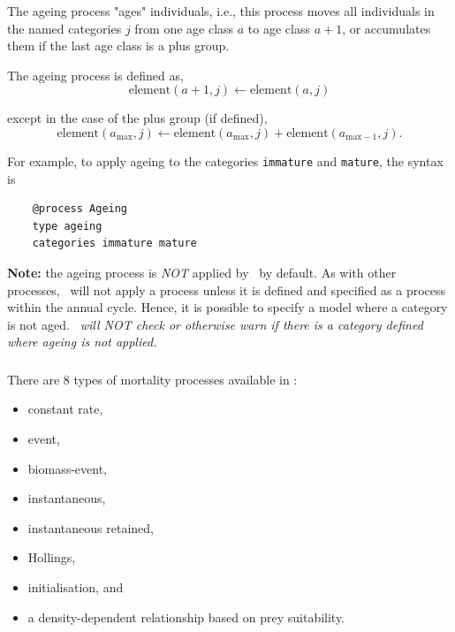 \subsubsection{\label{sec:ageing}}

The ageing process "ages" individuals, i.e., this process moves all individuals in the named categories $j$ from one age class $a$ to age class $a + 1$, or accumulates them if the last age class is a plus group.

The ageing process is defined as,
\begin{equation}
  \text{element}(a + 1,j) \leftarrow \text{element}(a,j)
\end{equation}

except in the case of the plus group (if defined),
\begin{equation}
  \text{element}(a_{\text{max}}, j) \leftarrow \text{element}(a_{\text{max}}, j) + \text{element}(a_{\text{max}-1}, j).
\end{equation}

For example, to apply ageing to the categories \texttt{immature} and \texttt{mature}, the syntax is

{\small{\begin{verbatim}
	@process Ageing
	type ageing
	categories immature mature
	\end{verbatim}}}

\textbf{Note:} the ageing process is \emph{NOT} applied by \CNAME\ by default. As with other processes, \CNAME\ will not apply a process unless it is defined and specified as a process within the annual cycle. Hence, it is possible to specify a model where a category is not aged. \emph{\CNAME\ will NOT check or otherwise warn if there is a category defined where ageing is not applied.}

\subsubsection{\label{sec:mortality}}

There are 8 types of mortality processes available in \CNAME:

\begin{itemize}
	\item constant rate,
	\item event,
	\item biomass-event,
	\item instantaneous,
	\item instantaneous retained,
	\item Hollings,
	\item initialisation, and
	\item a density-dependent relationship based on prey suitability.
\end{itemize}

